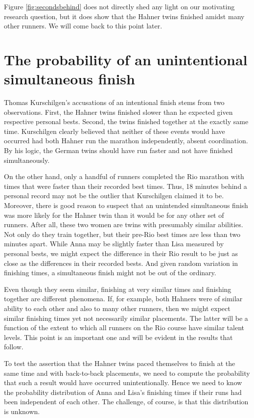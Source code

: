 \documentclass[12pt,titlepage]{article}
\begin{document}
Figure \ref{fig:secondsbehind} does not directly shed any light on our
motivating research question, but it does show that the Hahner twins
finished amidst many other runners.  We will come back to this point
later.

\section*{The probability of an unintentional simultaneous finish}

Thomas Kurschilgen's accusations of an intentional finish stems from
two observations. First, the Hahner twins finished slower than he
expected given respective personal bests. Second, the twins finished
together at the exactly same time. Kurschilgen clearly believed that
neither of these events would have occurred had both Hahner run the
marathon independently, absent coordination. By his logic, the German
twins should have run faster and not have finished simultaneously.

On the other hand, only a handful of runners completed the Rio
marathon with times that were faster than their recorded best times.
Thus, 18 minutes behind a personal record may not be the outlier that
Kurschilgen claimed it to be. Moreover, there is good reason to
suspect that an unintended simultaneous finish was more likely for the
Hahner twin than it would be for any other set of runners. After all,
these two women are twins with presumably similar abilities. Not only
do they train together, but their pre-Rio best times are less than two
minutes apart. While Anna may be slightly faster than Lisa measured by
personal bests, we might expect the difference in their Rio result to
be just as close as the differences in their recorded bests. And given
random variation in finishing times, a simultaneous finish might not
be out of the ordinary.

Even though they seem similar, finishing at very similar times and
finishing together are different phenomena. If, for example, both
Hahners were of similar ability to each other and also to many other
runners, then we might expect similar finishing times yet not
necessarily similar placements. The latter will be a function of the
extent to which all runners on the Rio course have similar talent
levels.  This point is an important one and will be evident in the
results that follow.

To test the assertion that the Hahner twins paced themselves to finish
at the same time and with back-to-back placements, we need to compute
the probability that such a result would have occurred
unintentionally. Hence we need to know the probability distribution of
Anna and Lisa's finishing times if their runs had been independent of
each other. The challenge, of course, is that this distribution is
unknown.  %
\end{document}
